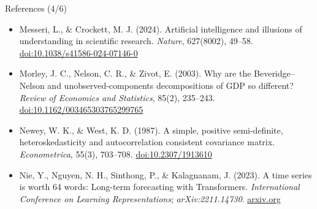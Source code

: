 \begin{frame}{References (4/6)}
\begin{itemize}
    \item Messeri, L., \& Crockett, M. J. (2024). Artificial intelligence and illusions of understanding in scientific research. \textit{Nature}, 627(8002), 49--58. \href{https://doi.org/10.1038/s41586-024-07146-0}{doi:10.1038/s41586-024-07146-0}
    \item Morley, J. C., Nelson, C. R., \& Zivot, E. (2003). Why are the Beveridge--Nelson and unobserved-components decompositions of GDP so different? \textit{Review of Economics and Statistics}, 85(2), 235--243. \href{https://doi.org/10.1162/003465303765299765}{doi:10.1162/003465303765299765}
    \item Newey, W. K., \& West, K. D. (1987). A simple, positive semi-definite, heteroskedasticity and autocorrelation consistent covariance matrix. \textit{Econometrica}, 55(3), 703--708. \href{https://doi.org/10.2307/1913610}{doi:10.2307/1913610}
    \item Nie, Y., Nguyen, N. H., Sinthong, P., \& Kalagnanam, J. (2023). A time series is worth 64 words: Long-term forecasting with Transformers. \textit{International Conference on Learning Representations}; \textit{arXiv:2211.14730}. \href{https://arxiv.org/abs/2211.14730}{arxiv.org}
\end{itemize}
\end{frame}

